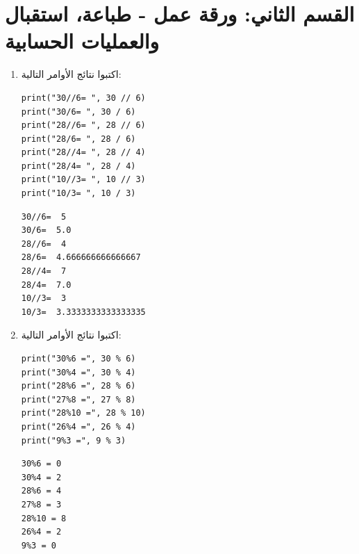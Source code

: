 \documentclass[14pt]{extarticle}
\begin{document}
\section*{القسم الثاني: ورقة عمل - طباعة، استقبال والعمليات الحسابية}

\begin{enumerate}[resume, label=\textbf{تمرين \arabic*:}, wide=0pt, itemsep=2.2em]

\item اكتبوا نتائج الأوامر التالية:

\begin{boxCode}
\begin{english}
\begin{verbatim}
print("30//6= ", 30 // 6)
print("30/6= ", 30 / 6)
print("28//6= ", 28 // 6)
print("28/6= ", 28 / 6)
print("28//4= ", 28 // 4)
print("28/4= ", 28 / 4)
print("10//3= ", 10 // 3)
print("10/3= ", 10 / 3)
\end{verbatim}
\end{english}
\end{boxCode}

\ifwithsols
\begin{boxSolution}
\begin{english}
\begin{verbatim}
30//6=  5
30/6=  5.0
28//6=  4
28/6=  4.666666666666667
28//4=  7
28/4=  7.0
10//3=  3
10/3=  3.3333333333333335
\end{verbatim}
\end{english}
\end{boxSolution}
\fi
\filbreak

\item اكتبوا نتائج الأوامر التالية:

\begin{boxCode}
\begin{english}
\begin{verbatim}
print("30%6 =", 30 % 6)
print("30%4 =", 30 % 4)
print("28%6 =", 28 % 6)
print("27%8 =", 27 % 8)
print("28%10 =", 28 % 10)
print("26%4 =", 26 % 4)
print("9%3 =", 9 % 3)
\end{verbatim}
\end{english}
\end{boxCode}

\ifwithsols
\begin{boxSolution}
\begin{english}
\begin{verbatim}
30%6 = 0
30%4 = 2
28%6 = 4
27%8 = 3
28%10 = 8
26%4 = 2
9%3 = 0
\end{verbatim}
\end{english}
\end{boxSolution}
\fi
\filbreak


\end{enumerate}
\end{document}
